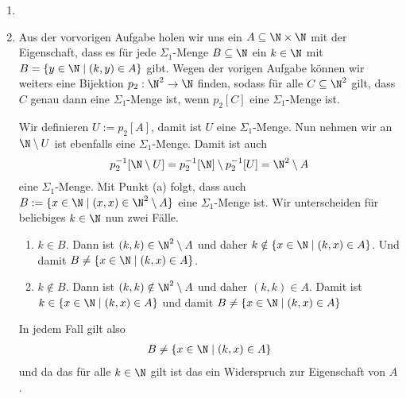 \begin{solution}

\phantom{}
	\begin{enumerate}[label = (\alph*)]
		\item 
		\item Aus der vorvorigen Aufgabe holen wir uns ein $A \subseteq \N \times \N$ mit der Eigenschaft, dass es für jede $\Sigma_1$-Menge $B \subseteq \N$ ein $k \in \N$ mit $B = \{y \in \N \mid (k,y) \in A\}$ gibt. Wegen der vorigen Aufgabe können wir weiters eine Bijektion $p_2: \N^2 \to \N$ finden, sodass für alle $C \subseteq \N^2$ gilt, dass $C$ genau dann eine $\Sigma_1$-Menge ist, wenn $p_2[C]$ eine $\Sigma_1$-Menge ist. 
		
		Wir definieren $U := p_2[A]$, damit ist $U$ eine $\Sigma_1$-Menge. Nun nehmen wir an $\N \setminus U$ ist ebenfalls eine $\Sigma_1$-Menge. Damit ist auch 
		\begin{align*}
			p_2^{-1}[\N \setminus U] = p_2^{-1}[\N] \setminus p_2^{-1}[U] = \N^2 \setminus A
		\end{align*}
		eine $\Sigma_1$-Menge. Mit Punkt (a) folgt, dass auch $B := \{x \in \N \mid (x,x) \in \N^2 \setminus A\}$ eine $\Sigma_1$-Menge ist. Wir unterscheiden für beliebiges $k \in \N$ nun zwei Fälle.
		\begin{enumerate}[label = Fall \arabic*:]
			\item $k \in B$. Dann ist $(k,k) \in \N^2 \setminus A$ und daher $k \notin \{x \in \N \mid (k,x) \in A\}$. Und damit $B \neq \{x \in \N \mid (k,x) \in A\}$.
			\item $k \notin B$. Dann ist $(k,k) \notin \N^2 \setminus A$ und daher $(k,k) \in A$. Damit ist  $k \in \{x \in \N \mid (k,x) \in A\}$ und damit $B \neq \{x \in \N \mid (k,x) \in A\}$
		\end{enumerate}
	In jedem Fall gilt also
	\begin{align*}
		B \neq \{x \in \N \mid (k,x) \in A\}
	\end{align*}
	und da das für alle $k \in \N$ gilt ist das ein Widerspruch zur Eigenschaft von $A$. 
	\end{enumerate}

\end{solution}
